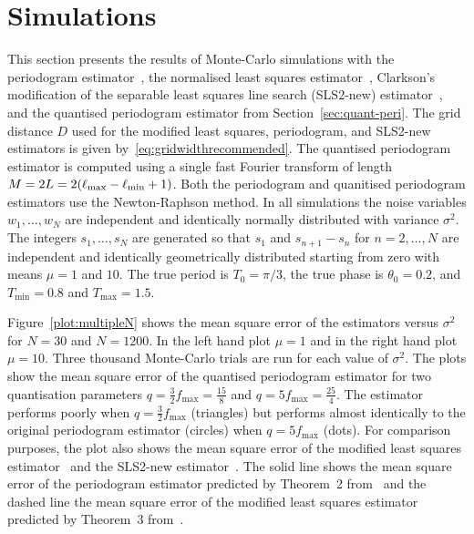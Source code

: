 \documentclass[10pt,twocolumn,twoside]{IEEEtran}
\begin{document}
\section{Simulations} \label{sec:simulations}

This section presents the results of Monte-Carlo simulations with the periodogram estimator~\cite{Haohuan2013435,Fogel1989_bit_synch_zero_crossings}, the normalised least squares estimator~\cite{Clarkson2007,McKilliam2007,Quinn_sparse_noisy_SSP_2012}, Clarkson's modification of the separable least squares line search (SLS2-new) estimator~\cite{Clarkson2007,Sidiropoulos2005}, and the quantised periodogram estimator from Section~\ref{sec:quant-peri}.  The grid distance $D$ used for the modified least squares, periodogram, and SLS2-new estimators is given by~\eqref{eq:gridwidthrecommended}.  The quantised periodogram estimator is computed using a single fast Fourier transform of length $M = 2L = 2(\ell_{\text{max}} - \ell_{\text{min}} + 1)$.  Both the periodogram and quanitised periodogram estimators use the Newton-Raphson method.  In all simulations the noise variables $w_1,\dots,w_N$ are independent and identically normally distributed with variance $\sigma^2$.  The integers $s_1,\dots,s_N$ are generated so that $s_1$ and $s_{n+1} - s_n$ for $n=2,\dots,N$ are independent and identically geometrically distributed starting from zero with means $\mu=1$ and $10$.  The true period is $T_0 = \pi/3$, the true phase is $\theta_0 = 0.2$, and $T_{\text{min}} = 0.8$ and $T_{\text{max}} = 1.5$.

Figure~\ref{plot:multipleN} shows the mean square error of the estimators versus $\sigma^2$ for $N = 30$ and $N = 1200$.  In the left hand  plot $\mu=1$ and in the right hand plot $\mu=10$.  %
Three thousand Monte-Carlo trials are run for each value of $\sigma^2$.  The plots show the mean square error of the quantised periodogram estimator for two quantisation parameters $q = \tfrac{3}{2}f_{\text{max}} = \tfrac{15}{8}$ and $q = 5 f_{\text{max}} = \tfrac{25}{4}$.  The estimator performs poorly when $q = \tfrac{3}{2}f_{\text{max}}$ (triangles) but performs almost identically to the original periodogram estimator (circles) when $q = 5 f_{\text{max}}$ (dots).  For comparison purposes, the plot also shows the mean square error of the modified least squares estimator~\cite{Clarkson2007,McKilliam2007} and the SLS2-new estimator~\cite{Clarkson2007,Sidiropoulos2005}.  %
The solid line shows the mean square error of the periodogram estimator predicted by Theorem~2 from~\cite{Quinn20013asilomar_period_est} and the dashed line the mean square error of the modified least squares estimator predicted by Theorem~3 from~\cite{Quinn_sparse_noisy_SSP_2012}.
\end{document}
